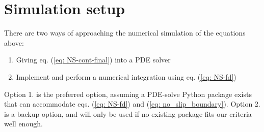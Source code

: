 \section{Simulation setup} \label{section: implementation}
There are two ways of approaching the numerical simulation of the equations above:
\begin{enumerate}
    \item Giving eq. (\ref{eq: NS-cont-final}) into a PDE solver
    \item Implement and perform a numerical integration using eq. (\ref{eq: NS-fd})
\end{enumerate}
Option 1. is the preferred option, assuming a PDE-solve Python package exists that can accommodate eqs. (\ref{eq: NS-fd}) and (\ref{eq: no_slip_boundary}). Option 2. is a backup option, and will only be used if no existing package fits our criteria well enough.
